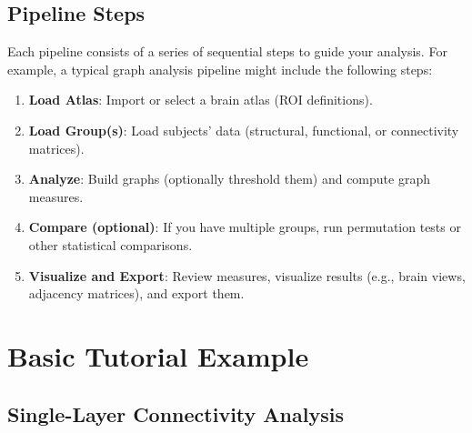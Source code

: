 \documentclass[justified]{tufte-handout}
\begin{document}

\subsection{Pipeline Steps}

Each pipeline consists of a series of sequential steps to guide your analysis. For example, a typical graph analysis pipeline might include the following steps:
\begin{enumerate}

\item \textbf{Load Atlas}: Import or select a brain atlas (ROI definitions).

\item \textbf{Load Group(s)}: Load subjects' data (structural, functional, or connectivity matrices).

\item \textbf{Analyze}: Build graphs (optionally threshold them) and compute graph measures.

\item \textbf{Compare (optional)}: If you have multiple groups, run permutation tests or other statistical comparisons.

\item \textbf{Visualize and Export}: Review measures, visualize results (e.g., brain views, adjacency matrices), and export them.

\end{enumerate}

\section{Basic Tutorial Example}

\subsection{Single-Layer Connectivity Analysis}
\end{document}
